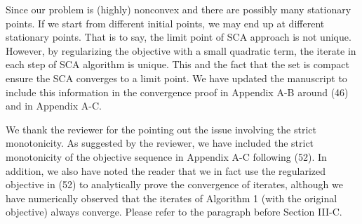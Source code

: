 \begin{enumerate}
Since our problem is (highly) nonconvex and there are possibly many stationary points. If we start from different initial points, we may end up at different stationary points. That is to say, the limit point of \ac{SCA} approach is not unique. However, by regularizing the objective with a small quadratic term, the iterate in each step of \ac{SCA} algorithm is unique. This and the fact that the set is compact ensure the \ac{SCA} converges to a limit point. We have updated the manuscript to include this information in the convergence proof in Appendix A-B around (46) and in Appendix A-C.

  

\resp We thank the reviewer for the pointing out the issue involving the strict monotonicity. As suggested by the reviewer, we have included the strict monotonicity of the objective sequence in Appendix A-C following (52). In addition, we also have noted the reader that we in fact use the regularized objective in (52) to analytically prove the convergence of iterates, although we have numerically observed that the iterates of Algorithm 1 (with the original objective) always converge. Please refer to the paragraph before Section III-C.


\end{enumerate}
